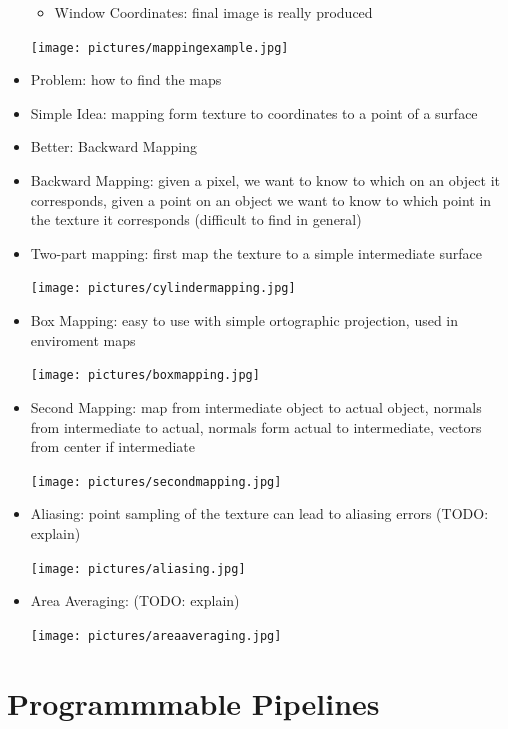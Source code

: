 \documentclass[11pt,a4paper]{article}
\begin{document}
\begin{itemize}
\begin{itemize}
				\item Window Coordinates: final image is really produced
			\end{itemize}
		\begin{center}
			\texttt{[image: pictures/mappingexample.jpg]}
		\end{center}
		\item Problem: how to find the maps
		\item Simple Idea: mapping form texture to coordinates to a point of a surface
		\item Better: Backward Mapping
		\item Backward Mapping: given a pixel, we want to know to which on an object it corresponds, given a point on an object we want to know to which point in the texture it corresponds (difficult to find in general)
		\item Two-part mapping: first map the texture to a simple intermediate surface
		\begin{center}
			\texttt{[image: pictures/cylindermapping.jpg]}
		\end{center}
		\item Box Mapping: easy to use with simple ortographic projection, used in enviroment maps
		\begin{center}
			\texttt{[image: pictures/boxmapping.jpg]}
		\end{center}
		\item Second Mapping: map from intermediate object to actual object, normals from intermediate to actual, normals form actual to intermediate, vectors from center if intermediate
		\begin{center}
			\texttt{[image: pictures/secondmapping.jpg]}
		\end{center}
		\item Aliasing: point sampling of the texture can lead to aliasing errors (TODO: explain)
		\begin{center}
			\texttt{[image: pictures/aliasing.jpg]}
		\end{center}
		\item Area Averaging: (TODO: explain)
		\begin{center}
			\texttt{[image: pictures/areaaveraging.jpg]}
		\end{center}
	\end{itemize}

\section{Programmmable Pipelines}
\end{document}
